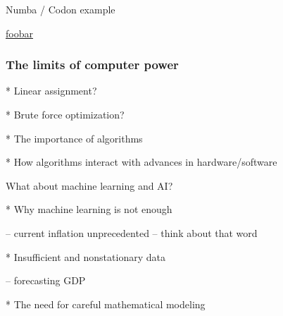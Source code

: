 \documentclass[
    xcolor={svgnames,dvipsnames},
    hyperref={colorlinks, citecolor=DeepPink4, linkcolor=DarkRed, urlcolor=DarkBlue}
    ]{beamer}  %
\newcommand{\1}{\mathbbm 1}
\begin{document}
\begin{frame}

    Numba / Codon example

    \url{foobar}

\end{frame}





\begin{frame}
    \frametitle{The limits of computer power}

    * Linear assignment?

    * Brute force optimization?
        
\end{frame}



\begin{frame}
    
    * The importance of algorithms

    * How algorithms interact with advances in hardware/software

\end{frame}

\begin{frame}

    What about machine learning and AI?

    * Why machine learning is not enough 

        -- current inflation unprecedented -- think about that word

    * Insufficient and nonstationary data 

        -- forecasting GDP

    * The need for careful mathematical modeling
    
\end{frame}
\end{document}

